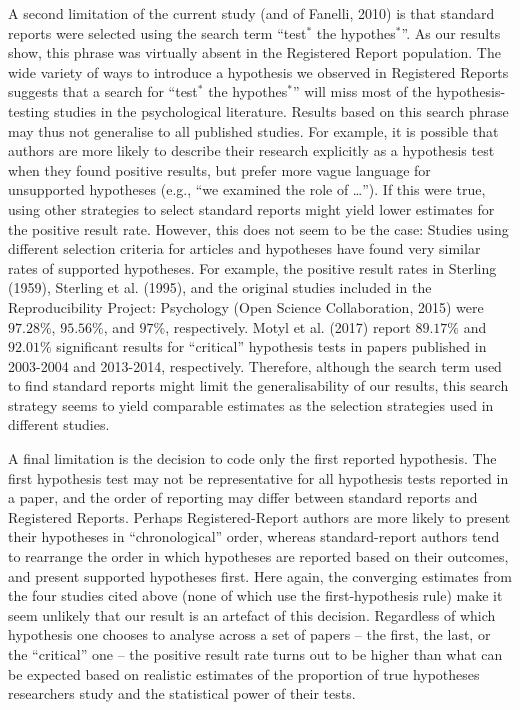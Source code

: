 \documentclass[british,,jou,floatsintext]{apa6}
\begin{document}
A second limitation of the current study (and of Fanelli, 2010) is that standard reports were selected using the search term \enquote{test\(^\ast\) the hypothes\(^\ast\)}.
As our results show, this phrase was virtually absent in the Registered Report population.
The wide variety of ways to introduce a hypothesis we observed in Registered Reports suggests that a search for \enquote{test\(^\ast\) the hypothes\(^\ast\)} will miss most of the hypothesis-testing studies in the psychological literature.
Results based on this search phrase may thus not generalise to all published studies.
For example, it is possible that authors are more likely to describe their research explicitly as a hypothesis test when they found positive results, but prefer more vague language for unsupported hypotheses (e.g., \enquote{we examined the role of \ldots{}}).
If this were true, using other strategies to select standard reports might yield lower estimates for the positive result rate.
However, this does not seem to be the case:
Studies using different selection criteria for articles and hypotheses have found very similar rates of supported hypotheses.
For example, the positive result rates in Sterling (1959), Sterling et al. (1995), and the original studies included in the Reproducibility Project: Psychology (Open Science Collaboration, 2015) were \(97.28\%\), \(95.56\%\), and \(97\%\), respectively.
Motyl et al. (2017) report \(89.17\%\) and \(92.01\%\) significant results for \enquote{critical} hypothesis tests in papers published in 2003-2004 and 2013-2014, respectively.
Therefore, although the search term used to find standard reports might limit the generalisability of our results, this search strategy seems to yield comparable estimates as the selection strategies used in different studies.

A final limitation is the decision to code only the first reported hypothesis.
The first hypothesis test may not be representative for all hypothesis tests reported in a paper, and the order of reporting may differ between standard reports and Registered Reports.
Perhaps Registered-Report authors are more likely to present their hypotheses in \enquote{chronological} order, whereas standard-report authors tend to rearrange the order in which hypotheses are reported based on their outcomes, and present supported hypotheses first.
Here again, the converging estimates from the four studies cited above (none of which use the first-hypothesis rule) make it seem unlikely that our result is an artefact of this decision.
Regardless of which hypothesis one chooses to analyse across a set of papers -- the first, the last, or the \enquote{critical} one -- the positive result rate turns out to be higher than what can be expected based on realistic estimates of the proportion of true hypotheses researchers study and the statistical power of their tests.
\end{document}
